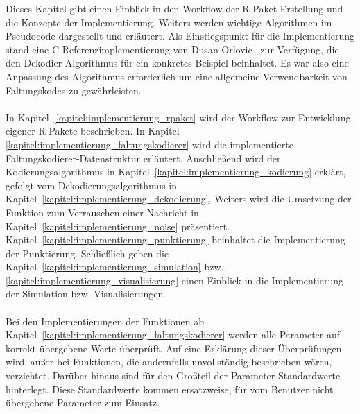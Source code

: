 Dieses Kapitel gibt einen Einblick in den Workflow der R-Paket Erstellung und die Konzepte der Implementierung. Weiters werden wichtige Algorithmen im Pseudocode dargestellt und erläutert. Als Einstiegspunkt für die Implementierung stand eine C-Referenzimplementierung von Dusan Orlovic~\cite{SOVA} zur Verfügung, die den Dekodier-Algorithmus für ein konkretes Beispiel beinhaltet. Es war also eine Anpassung des Algorithmus erforderlich um eine allgemeine Verwendbarkeit von Faltungskodes zu gewährleisten.
\\
\\
In Kapitel~\ref{kapitel:implementierung_rpaket} wird der Workflow zur Entwicklung eigener R-Pakete beschrieben. In Kapitel \ref{kapitel:implementierung_faltungskodierer} wird die implementierte Faltungskodierer-Datenstruktur erläutert. Anschließend wird der Kodierungsalgorithmus in Kapitel~\ref{kapitel:implementierung_kodierung} erklärt, gefolgt vom Dekodierungsalgorithmus in Kapitel~\ref{kapitel:implementierung_dekodierung}. Weiters wird die Umsetzung der Funktion zum Verrauschen einer Nachricht in Kapitel~\ref{kapitel:implementierung_noise} präsentiert. Kapitel~\ref{kapitel:implementierung_punktierung} beinhaltet die Implementierung der Punktierung. Schließlich geben die Kapitel~\ref{kapitel:implementierung_simulation} bzw. \ref{kapitel:implementierung_visualisierung} einen Einblick in die Implementierung der Simulation bzw. Visualisierungen.
\\
\\
Bei den Implementierungen der Funktionen ab Kapitel~\ref{kapitel:implementierung_faltungskodierer} werden alle Parameter auf korrekt übergebene Werte überprüft. Auf eine Erklärung dieser Überprüfungen wird, außer bei Funktionen, die andernfalls unvollständig beschrieben wären, verzichtet. Darüber hinaus sind für den Großteil der Parameter Standardwerte hinterlegt. Diese Standardwerte kommen ersatzweise, für vom Benutzer nicht übergebene Parameter zum Einsatz.
